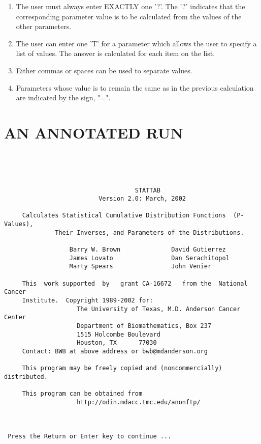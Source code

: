 \documentclass[12pt,dvips]{article}
\newcommand{\mysection}[1]
    {\color{blue} \section{#1} \color{black}}
\begin{document}
\begin{enumerate}
\item The user must always enter EXACTLY one '?'.  The '?' indicates that
     the corresponding parameter value is to  be calculated from the values
     of the other parameters.
     
\item The user can enter one 'T' for a parameter which allows the user to
     specify a list of values.  The  answer is  calculated for each item on
     the list.
     
\item Either commas or spaces can be used to separate values.
     
\item  Parameters whose value is  to remain  the same as  in the previous
     calculation are indicated by the sign, "=".
    
\end{enumerate}


\mysection{ AN ANNOTATED RUN}    
 
\begin{verbatim}




                                    STATTAB
                          Version 2.0: March, 2002

     Calculates Statistical Cumulative Distribution Functions  (P-Values),
              Their Inverses, and Parameters of the Distributions.

                  Barry W. Brown              David Gutierrez
                  James Lovato                Dan Serachitopol
                  Marty Spears                John Venier

     This  work supported  by   grant CA-16672   from the  National  Cancer
     Institute.  Copyright 1989-2002 for:
                    The University of Texas, M.D. Anderson Cancer Center
                    Department of Biomathematics, Box 237
                    1515 Holcombe Boulevard
                    Houston, TX      77030
     Contact: BWB at above address or bwb@mdanderson.org

     This program may be freely copied and (noncommercially) distributed.

     This program can be obtained from
                    http://odin.mdacc.tmc.edu/anonftp/



 Press the Return or Enter key to continue ...

\end{verbatim}
\end{document}
